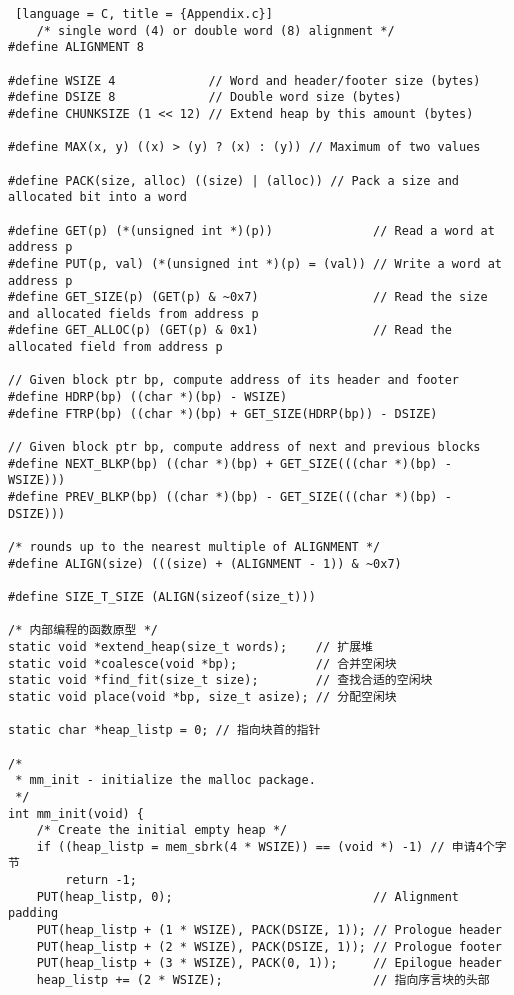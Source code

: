 \begin{lstlisting} [language = C, title = {Appendix.c}]
    /* single word (4) or double word (8) alignment */
#define ALIGNMENT 8

#define WSIZE 4             // Word and header/footer size (bytes)
#define DSIZE 8             // Double word size (bytes)
#define CHUNKSIZE (1 << 12) // Extend heap by this amount (bytes)

#define MAX(x, y) ((x) > (y) ? (x) : (y)) // Maximum of two values

#define PACK(size, alloc) ((size) | (alloc)) // Pack a size and allocated bit into a word

#define GET(p) (*(unsigned int *)(p))              // Read a word at address p
#define PUT(p, val) (*(unsigned int *)(p) = (val)) // Write a word at address p
#define GET_SIZE(p) (GET(p) & ~0x7)                // Read the size and allocated fields from address p
#define GET_ALLOC(p) (GET(p) & 0x1)                // Read the allocated field from address p

// Given block ptr bp, compute address of its header and footer
#define HDRP(bp) ((char *)(bp) - WSIZE)
#define FTRP(bp) ((char *)(bp) + GET_SIZE(HDRP(bp)) - DSIZE)

// Given block ptr bp, compute address of next and previous blocks
#define NEXT_BLKP(bp) ((char *)(bp) + GET_SIZE(((char *)(bp) - WSIZE)))
#define PREV_BLKP(bp) ((char *)(bp) - GET_SIZE(((char *)(bp) - DSIZE)))

/* rounds up to the nearest multiple of ALIGNMENT */
#define ALIGN(size) (((size) + (ALIGNMENT - 1)) & ~0x7)

#define SIZE_T_SIZE (ALIGN(sizeof(size_t)))

/* 内部编程的函数原型 */
static void *extend_heap(size_t words);    // 扩展堆
static void *coalesce(void *bp);           // 合并空闲块
static void *find_fit(size_t size);        // 查找合适的空闲块
static void place(void *bp, size_t asize); // 分配空闲块

static char *heap_listp = 0; // 指向块首的指针

/*
 * mm_init - initialize the malloc package.
 */
int mm_init(void) {
    /* Create the initial empty heap */
    if ((heap_listp = mem_sbrk(4 * WSIZE)) == (void *) -1) // 申请4个字节
        return -1;
    PUT(heap_listp, 0);                            // Alignment padding
    PUT(heap_listp + (1 * WSIZE), PACK(DSIZE, 1)); // Prologue header
    PUT(heap_listp + (2 * WSIZE), PACK(DSIZE, 1)); // Prologue footer
    PUT(heap_listp + (3 * WSIZE), PACK(0, 1));     // Epilogue header
    heap_listp += (2 * WSIZE);                     // 指向序言块的头部


\end{lstlisting}
